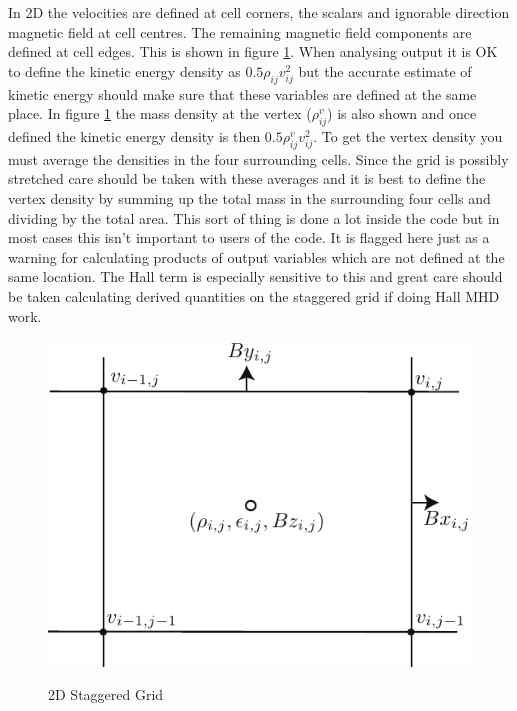 \documentclass[11pt]{article}
\begin{document}
In 2D the velocities are defined at cell corners, the scalars and ignorable direction magnetic field at cell centres. 
The remaining magnetic field components are defined at cell edges. This is shown in figure \ref{2d-staggered}. When 
analysing output it is OK to define the kinetic energy density as $0.5\rho_{ij}v_{ij}^2$ but the accurate estimate of 
kinetic energy should make sure that these variables are defined at the same place. In figure \ref{2d-staggered} the 
mass density at the vertex ($\rho_{ij}^v$) is also shown and once defined the kinetic energy density is then  
$0.5\rho_{ij}^v v_{ij}^2$. To get the vertex density you must average the densities in the four surrounding cells. 
Since the grid is possibly stretched care should be taken with these averages and it is best to define the vertex 
density by summing up the total mass in the surrounding four cells and dividing by the total area. This sort of thing 
is done a lot inside the code but in most cases this isn't important to users of the code. It is flagged here just 
as a warning for calculating products of output variables which are not defined at the same location. The Hall term 
is especially sensitive to this and great care should be taken calculating derived quantities on the staggered grid if doing Hall MHD work.

\begin{figure}
\begin{center}{\includegraphics{2d-staggered-grid.pdf}}\end{center}
\caption{2D Staggered Grid}
\label{2d-staggered}
\end{figure}
\end{document}
